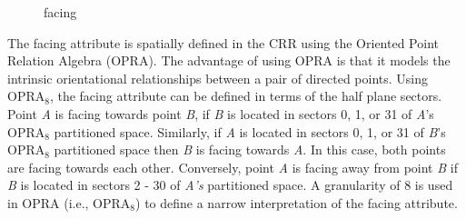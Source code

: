 \documentclass[12pt]{ucthesis}
\begin{document}
\begin{figure}[H]
 \centering
 \hspace{10 mm}
  \hspace{10 mm}
 \hspace{10 mm}
 \caption{facing}
\label{display-arrangement}
\end{figure}

The facing attribute is spatially defined in the CRR using the Oriented Point Relation Algebra (OPRA). The advantage of using OPRA is that it models the intrinsic orientational relationships between a pair of directed points. Using OPRA$_{8}$, the facing attribute can be defined in terms of the half plane sectors. Point \emph{A} is facing towards point \emph{B}, if \emph{B} is located in sectors 0, 1, or 31 of \emph{A}'s OPRA$_{8}$ partitioned space. Similarly, if \emph{A} is located in sectors 0, 1, or 31 of \emph{B}'s OPRA$_{8}$ partitioned space then \emph{B} is facing towards \emph{A}. In this case, both points are facing towards each other. Conversely, point \emph{A} is facing away from point \emph{B} if \emph{B} is located in sectors 2 - 30 of \emph{A's} partitioned space. A granularity of 8 is used in OPRA (i.e., OPRA$_{8}$) to define a narrow interpretation of the facing attribute. 

\end{document}
